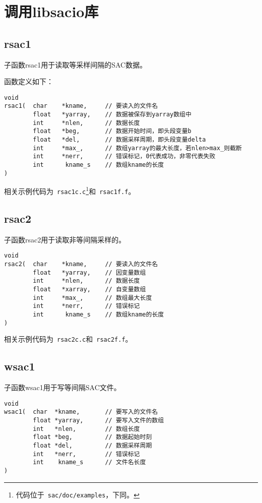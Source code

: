 \section{调用libsacio库}
\subsection{rsac1}
子函数rsac1用于读取等采样间隔的SAC数据。

函数定义如下：
\begin{verbatim}
void
rsac1(  char    *kname,     // 要读入的文件名
        float   *yarray,    // 数据被保存到yarray数组中
        int     *nlen,      // 数据长度
        float   *beg,       // 数据开始时间，即头段变量b
        float   *del,       // 数据采样周期，即头段变量delta
        int     *max_,      // 数组yarray的最大长度，若nlen>max_则截断
        int     *nerr,      // 错误标记，0代表成功，非零代表失败
        int      kname_s    // 数组kname的长度
)
\end{verbatim}

相关示例代码为~\verb+rsac1c.c+\footnote{代码位于~\verb+sac/doc/examples+，下同。}和~\verb+rsac1f.f+。

\subsection{rsac2}
子函数rsac2用于读取非等间隔采样的。
\begin{verbatim}
void
rsac2(  char    *kname,     // 要读入的文件名
        float   *yarray,    // 因变量数组
        int     *nlen,      // 数据长度
        float   *xarray,    // 自变量数组
        int     *max_,      // 数组最大长度
        int     *nerr,      // 错误标记
        int      kname_s    // 数组kname的长度
)
\end{verbatim}
相关示例代码为~\verb+rsac2c.c+和~\verb+rsac2f.f+。

\subsection{wsac1}
子函数wsac1用于写等间隔SAC文件。
\begin{verbatim}
void
wsac1(  char  *kname,       // 要写入的文件名
        float *yarray,      // 要写入文件的数组
        int   *nlen,        // 数组长度
        float *beg,         // 数据起始时刻
        float *del,         // 数据采样周期
        int   *nerr,        // 错误标记
        int    kname_s      // 文件名长度
)
\end{verbatim}

